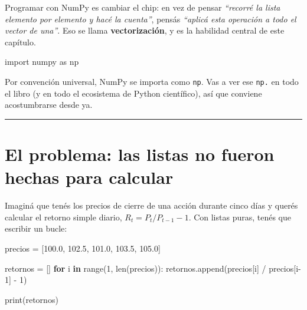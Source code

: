 \documentclass[
  spanish,
  letterpaper,
  DIV=11,
  numbers=noendperiod]{scrreprt}
\newenvironment{Shaded}{\begin{snugshade}}{\end{snugshade}}
\newcommand{\BuiltInTok}[1]{\textcolor[rgb]{0.00,0.23,0.31}{#1}}
\newcommand{\ControlFlowTok}[1]{\textcolor[rgb]{0.00,0.23,0.31}{\textbf{#1}}}
\newcommand{\DecValTok}[1]{\textcolor[rgb]{0.68,0.00,0.00}{#1}}
\newcommand{\FloatTok}[1]{\textcolor[rgb]{0.68,0.00,0.00}{#1}}
\newcommand{\ImportTok}[1]{\textcolor[rgb]{0.00,0.46,0.62}{#1}}
\newcommand{\KeywordTok}[1]{\textcolor[rgb]{0.00,0.23,0.31}{\textbf{#1}}}
\newcommand{\NormalTok}[1]{\textcolor[rgb]{0.00,0.23,0.31}{#1}}
\newcommand{\OperatorTok}[1]{\textcolor[rgb]{0.37,0.37,0.37}{#1}}
\begin{document}
\begin{tcolorbox}[enhanced jigsaw, bottomrule=.15mm, colback=white, opacitybacktitle=0.6, arc=.35mm, toprule=.15mm, opacityback=0, breakable, titlerule=0mm, left=2mm, coltitle=black, colbacktitle=quarto-callout-tip-color!10!white, colframe=quarto-callout-tip-color-frame, leftrule=.75mm, toptitle=1mm, bottomtitle=1mm, title=\textcolor{quarto-callout-tip-color}{\faLightbulb}\hspace{0.5em}{La idea de fondo}, rightrule=.15mm]

Programar con NumPy es cambiar el chip: en vez de pensar \emph{``recorré
la lista elemento por elemento y hacé la cuenta''}, pensás
\emph{``aplicá esta operación a todo el vector de una''}. Eso se llama
\textbf{vectorización}, y es la habilidad central de este capítulo.

\end{tcolorbox}

\label{setup}
\begin{Shaded}
\begin{Highlighting}[]
\ImportTok{import}\NormalTok{ numpy }\ImportTok{as}\NormalTok{ np}
\end{Highlighting}
\end{Shaded}

Por convención universal, NumPy se importa como \texttt{np}. Vas a ver
ese \texttt{np.} en todo el libro (y en todo el ecosistema de Python
científico), así que conviene acostumbrarse desde ya.

\begin{center}\rule{0.5\linewidth}{0.5pt}\end{center}

\section{El problema: las listas no fueron hechas para
calcular}\label{el-problema-las-listas-no-fueron-hechas-para-calcular}

Imaginá que tenés los precios de cierre de una acción durante cinco días
y querés calcular el retorno simple diario, \(R_t = P_t / P_{t-1} - 1\).
Con listas puras, tenés que escribir un bucle:

\label{listas-loop}
\begin{Shaded}
\begin{Highlighting}[]
\NormalTok{precios }\OperatorTok{=}\NormalTok{ [}\FloatTok{100.0}\NormalTok{, }\FloatTok{102.5}\NormalTok{, }\FloatTok{101.0}\NormalTok{, }\FloatTok{103.5}\NormalTok{, }\FloatTok{105.0}\NormalTok{]}

\NormalTok{retornos }\OperatorTok{=}\NormalTok{ []}
\ControlFlowTok{for}\NormalTok{ i }\KeywordTok{in} \BuiltInTok{range}\NormalTok{(}\DecValTok{1}\NormalTok{, }\BuiltInTok{len}\NormalTok{(precios)):}
\NormalTok{    retornos.append(precios[i] }\OperatorTok{/}\NormalTok{ precios[i}\OperatorTok{{-}}\DecValTok{1}\NormalTok{] }\OperatorTok{{-}} \DecValTok{1}\NormalTok{)}

\BuiltInTok{print}\NormalTok{(retornos)}
\end{Highlighting}
\end{Shaded}
\end{document}
